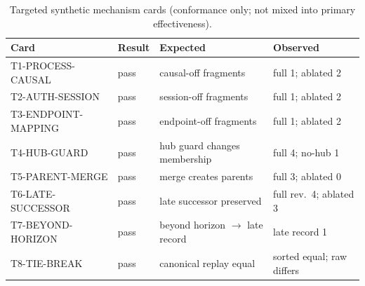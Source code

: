 \begin{table}[!t]
\caption{Targeted synthetic mechanism cards (conformance only; not mixed into primary effectiveness).}
\label{tab:mechanism}
\centering
\small
\setlength{\tabcolsep}{4pt}
\begin{tabular}{@{}llll@{}}
\toprule
\textbf{Card} & \textbf{Result} & \textbf{Expected} & \textbf{Observed} \\
\midrule
T1-PROCESS-CAUSAL & pass & causal-off fragments & full 1; ablated 2 \\
T2-AUTH-SESSION & pass & session-off fragments & full 1; ablated 2 \\
T3-ENDPOINT-MAPPING & pass & endpoint-off fragments & full 1; ablated 2 \\
T4-HUB-GUARD & pass & hub guard changes membership & full 4; no-hub 1 \\
T5-PARENT-MERGE & pass & merge creates parents & full 3; ablated 0 \\
T6-LATE-SUCCESSOR & pass & late successor preserved & full rev.\ 4; ablated 3 \\
T7-BEYOND-HORIZON & pass & beyond horizon $\rightarrow$ late record & late record 1 \\
T8-TIE-BREAK & pass & canonical replay equal & sorted equal; raw differs \\
\bottomrule
\end{tabular}
\end{table}
